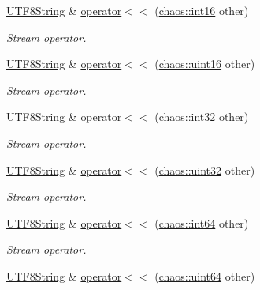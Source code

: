 \begin{DoxyCompactItemize}
\hyperlink{classchaos_1_1str_1_1_u_t_f8_string}{U\-T\-F8\-String} \& \hyperlink{classchaos_1_1str_1_1_u_t_f8_string_a970df73b6bbb3d31fe5bcf53bc654be6}{operator$<$$<$} (\hyperlink{namespacechaos_a23112b8188c8a6ad32a86041fb4c088e}{chaos\-::int16} other)
\begin{DoxyCompactList}\small\item\em Stream operator. \end{DoxyCompactList}\item 
\hyperlink{classchaos_1_1str_1_1_u_t_f8_string}{U\-T\-F8\-String} \& \hyperlink{classchaos_1_1str_1_1_u_t_f8_string_aa1ae66a5b283279df734eab632e398cf}{operator$<$$<$} (\hyperlink{namespacechaos_ac3888b1c9e56da7fbbdb3ab8425b4068}{chaos\-::uint16} other)
\begin{DoxyCompactList}\small\item\em Stream operator. \end{DoxyCompactList}\item 
\hyperlink{classchaos_1_1str_1_1_u_t_f8_string}{U\-T\-F8\-String} \& \hyperlink{classchaos_1_1str_1_1_u_t_f8_string_a1c174fd024e1535a2f485e290540a2a1}{operator$<$$<$} (\hyperlink{namespacechaos_ad1de7efb430365afd2c9446a0f522a90}{chaos\-::int32} other)
\begin{DoxyCompactList}\small\item\em Stream operator. \end{DoxyCompactList}\item 
\hyperlink{classchaos_1_1str_1_1_u_t_f8_string}{U\-T\-F8\-String} \& \hyperlink{classchaos_1_1str_1_1_u_t_f8_string_a99aa07fcc88a65befe5e530933839fab}{operator$<$$<$} (\hyperlink{namespacechaos_a3b3a47ba1e284655bf1a30c441121c60}{chaos\-::uint32} other)
\begin{DoxyCompactList}\small\item\em Stream operator. \end{DoxyCompactList}\item 
\hyperlink{classchaos_1_1str_1_1_u_t_f8_string}{U\-T\-F8\-String} \& \hyperlink{classchaos_1_1str_1_1_u_t_f8_string_a5fac3cdc0e1aa0bdefce09a0dab085cf}{operator$<$$<$} (\hyperlink{namespacechaos_a46c61f58d99879b936f58234b9a05e0c}{chaos\-::int64} other)
\begin{DoxyCompactList}\small\item\em Stream operator. \end{DoxyCompactList}\item 
\hyperlink{classchaos_1_1str_1_1_u_t_f8_string}{U\-T\-F8\-String} \& \hyperlink{classchaos_1_1str_1_1_u_t_f8_string_a0f069c833c4fad2e87f9e4fb1138eca6}{operator$<$$<$} (\hyperlink{namespacechaos_a34fe5f5bfc3ef6d80b5d094ed91b4d6e}{chaos\-::uint64} other)

\end{DoxyCompactItemize}
